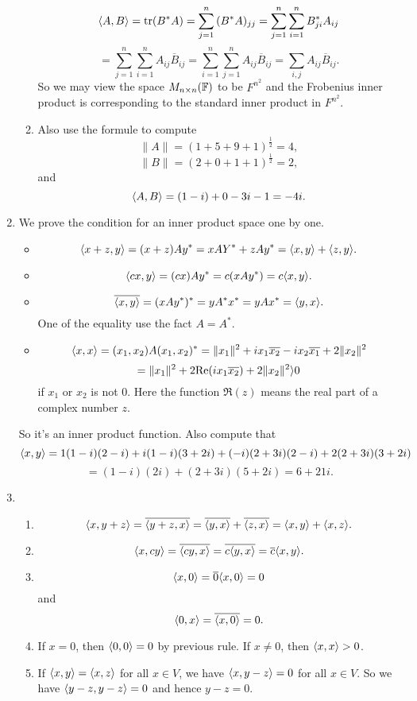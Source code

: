 \begin{enumerate}
\begin{enumerate}
\[\langle A,B\rangle =\operatorname{tr}(B^*A)=\sum_{j=1}^n{(B^*A)_{jj}}=\sum_{j=1}^n{\sum_{i=1}^n{B^*_{ji}A_{ij}}}\]
\[=\sum_{j=1}^n{\sum_{i=1}^n{A_{ij}\overline{B}_{ij}}}=\sum_{i=1}^n{\sum_{j=1}^n{A_{ij}\overline{B}_{ij}}}=\sum_{i,j}{A_{ij}\overline{B}_{ij}}.\]
So we may view the space $M_{n\times n}(\mathbb{F})$ to be $F^{n^2}$ and the Frobenius inner product is corresponding to the standard inner product in $F^{n^2}$.
\item Also use the formule to compute
\[\|A\|=(1+5+9+1)^{\frac{1}{2}}=4,\]
\[\|B\|=(2+0+1+1)^{\frac{1}{2}}=2,\]
and 
\[\langle A,B\rangle =(1-i)+0-3i-1=-4i.\]
\end{enumerate}
\item We prove the condition for an inner product space one by one.
\begin{itemize}
\item \[\langle x+z,y\rangle =(x+z)Ay^*=xAY^*+zAy^*=\langle x,y\rangle +\langle z,y\rangle .\]
\item \[\langle cx,y\rangle =(cx)Ay^*=c(xAy^*)=c\langle x,y\rangle .\]
\item \[\overline{\langle x,y\rangle }=(xAy^*)^*=yA^*x^*=yAx^*=\langle y,x\rangle .\]
One of the equality use the fact $A=A^*$.
\item \[\langle x,x\rangle =(x_1,x_2)A(x_1,x_2)^*=\|x_1\|^2+ix_1\overline{x_2}-ix_2\overline{x_1}+2\|x_2\|^2\]
\[=\|x_1\|^2+2\mathrm{Re}(ix_1\overline{x_2})+2\|x_2\|^2\rangle 0\]
if $x_1$ or $x_2$ is not $0$. Here the function $\Re(z)$ means the real part of a complex number $z$.
\end{itemize}
So it's an inner product function. Also compute that 
\[\langle x,y\rangle =1(1-i)(2-i)+i(1-i)(3+2i)+(-i)(2+3i)(2-i)+2(2+3i)(3+2i)\]
\[=(1-i)(2i)+(2+3i)(5+2i)=6+21i.\]
\item \begin{enumerate}
\item \[\langle x,y+z\rangle =\overline{\langle y+z,x\rangle }=\overline{\langle y,x\rangle }+\overline{\langle z,x\rangle }=\langle x,y\rangle +\langle x,z\rangle .\]
\item \[\langle x,cy\rangle =\overline{\langle cy,x\rangle }=\overline{c\langle y,x\rangle }=\overline{c}\langle x,y\rangle .\]
\item \[\langle x,0\rangle =\overline{0}\langle x,0\rangle =0\]
and 
\[\langle 0,x\rangle =\overline{\langle x,0\rangle }=0.\]
\item If $x=0$, then $\langle 0,0\rangle =0$ by previous rule. If $x\neq 0$, then $\langle x,x\rangle >0$.
\item If $\langle x,y\rangle =\langle x,z\rangle $ for all $x\in V$, we have $\langle x,y-z\rangle =0$ for all $x\in V$. So we have $\langle y-z,y-z\rangle =0$ and hence $y-z=0$.

\end{enumerate}
\end{enumerate}

